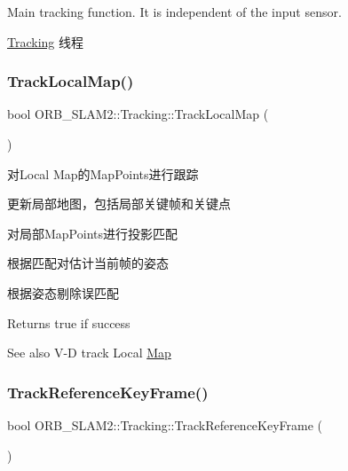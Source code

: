 Main tracking function. It is independent of the input sensor. 

\mbox{\hyperlink{class_o_r_b___s_l_a_m2_1_1_tracking}{Tracking}} 线程 \mbox{\label{class_o_r_b___s_l_a_m2_1_1_tracking_af670c614f4e10d58c9f7aad9865b5c08}} 
\subsubsection{\texorpdfstring{Track\+Local\+Map()}{TrackLocalMap()}}
{\footnotesize\ttfamily bool O\+R\+B\+\_\+\+S\+L\+A\+M2\+::\+Tracking\+::\+Track\+Local\+Map (\begin{DoxyParamCaption}{ }\end{DoxyParamCaption})\hspace{0.3cm}{\ttfamily [protected]}}



对\+Local Map的\+Map\+Points进行跟踪 


\begin{DoxyEnumerate}
\item 更新局部地图，包括局部关键帧和关键点
\item 对局部\+Map\+Points进行投影匹配
\item 根据匹配对估计当前帧的姿态
\item 根据姿态剔除误匹配 \begin{DoxyReturn}{Returns}
true if success 
\end{DoxyReturn}
\begin{DoxySeeAlso}{See also}
V-\/D track Local \mbox{\hyperlink{class_o_r_b___s_l_a_m2_1_1_map}{Map}} 
\end{DoxySeeAlso}

\end{DoxyEnumerate}\mbox{\label{class_o_r_b___s_l_a_m2_1_1_tracking_a737c5409c93844353561a0fe724ed1c2}} 
\subsubsection{\texorpdfstring{Track\+Reference\+Key\+Frame()}{TrackReferenceKeyFrame()}}
{\footnotesize\ttfamily bool O\+R\+B\+\_\+\+S\+L\+A\+M2\+::\+Tracking\+::\+Track\+Reference\+Key\+Frame (\begin{DoxyParamCaption}{ }\end{DoxyParamCaption})\hspace{0.3cm}{\ttfamily [protected]}}



